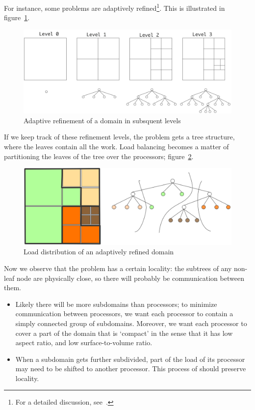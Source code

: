 For instance, some problems are adaptively
refined\footnote{For a detailed
  discussion, see~\cite{Campbell:octree}.}. This is illustrated in
figure~\ref{fig:octree1}.
\begin{figure}[ht]
  \includegraphics[scale=.14]{graphics-public/my_octree1}
  \caption{Adaptive refinement of a domain in subsquent levels}
  \label{fig:octree1}
\end{figure}
If we keep track of these refinement levels, the problem gets a tree
structure, where the leaves contain all the work.
Load balancing becomes a matter of partitioning the leaves of the
tree over the processors; figure~\ref{fig:octree2}.
\begin{figure}[ht]
  \includegraphics[scale=.18]{graphics-public/my_octree2}
  \caption{Load distribution of an adaptively refined domain}
  \label{fig:octree2}
\end{figure}
Now we observe that the problem has a certain locality: the subtrees
of any non-leaf node are physically close, so there will probably be
communication between them. 
\begin{itemize}
\item Likely there will be more subdomains than processors; to
  minimize communication between processors, we want each processor to
  contain a simply connected group of subdomains. Moreover, we want
  each processor to cover a part of the domain that is `compact' in
  the sense that it has low aspect ratio, and low surface-to-volume
  ratio.
\item When a subdomain gets further subdivided, part of the load of
  its processor may need to be shifted to another processor. This
  process of  should preserve
  locality.
\end{itemize}


